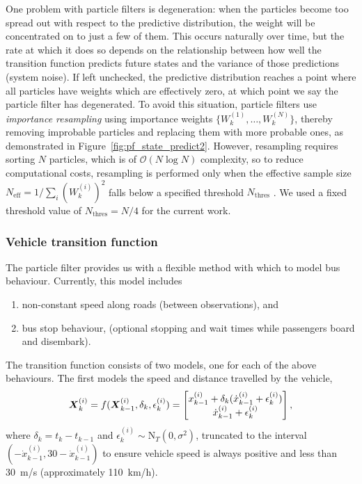 One problem with particle filters is degeneration:
when the particles become too spread out with respect to the predictive distribution,
the weight will be concentrated on to just a few of them.
This occurs naturally over time, but the rate at which it does so depends 
on the relationship between how well the transition function predicts future states
and the variance of those predictions (system noise).
If left unchecked, the predictive distribution reaches a point
where all particles have weights which are effectively zero,
at which point we say the particle filter has degenerated.
To avoid this situation,
particle filters use \emph{importance resampling}
using importance weights $\{W_k^{(1)}, \ldots, W_k^{(N)}\}$,
thereby removing improbable particles and replacing them with more probable ones,
as demonstrated in Figure~\ref{fig:pf_state_predict2}.
However, resampling requires sorting $N$ particles,
which is of $\mathcal{O}(N\log N)$ complexity,
so to reduce computational costs, resampling is performed only when
the effective sample size $N_{\text{eff}} = 1 / \sum_i (W_k^{(i)})^2$
falls below a specified threshold $N_{\text{thres}}$
\citep{Gustafsson_2002}.
We used a fixed threshold value of $N_{\text{thres}} = N/4$
for the current work.


\subsubsection{Vehicle transition function}
\label{sec:pf_prediction}

The particle filter provides us with a flexible method
with which to model bus behaviour.
Currently, this model includes
\begin{enumerate}
\item non-constant speed along roads (between observations), and
\item bus stop behaviour, (optional stopping and wait times while passengers board and disembark).
\end{enumerate}
The transition function consists of two models,
one for each of the above behaviours.
The first models the speed and distance travelled by the vehicle,
\begin{equation}
\label{eq:trans_newton}
\mbox{$\boldsymbol{X}$}_k^{(i)} = f(\mbox{$\boldsymbol{X}$}_{k-1}^{(i)}, \delta_k, \epsilon_k^{(i)}) = 
    \begin{bmatrix}
        x_{k-1}^{(i)} + \delta_k(\dot x_{k-1}^{(i)} + \epsilon_k^{(i)}) \\
        \dot x_{k-1}^{(i)} + \epsilon_k^{(i)}
    \end{bmatrix},
\end{equation}
where $\delta_k = t_k - t_{k-1}$
and $\epsilon_k^{(i)}\sim\mathrm{N}_T(0, \sigma^2)$, truncated to the interval
$(-\dot x_{k-1}^{(i)}, 30 - \dot x_{k-1}^{(i)})$
to ensure vehicle speed is always positive and less than 30~m/s
(approximately 110~km/h).


